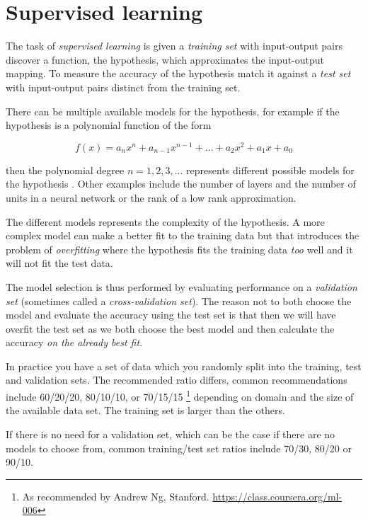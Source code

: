 
\section{Supervised learning}\label{sec:theory:suplearn}

The task of \textit{supervised learning} is given a \textit{training set} with input-output pairs discover a function, the hypothesis, which approximates the input-output mapping.  To measure the accuracy of the hypothesis match it against a \textit{test set} with input-output pairs distinct from the training set.
\citep{norvigAI}

There can be multiple available models for the hypothesis, for example if the hypothesis is a polynomial function of the form 

\begin{equation}
f(x) = a_n x^n + a_{n - 1} x^{n - 1} + ... + a_2 x^2 + a_1 x + a_0
\end{equation}

then the polynomial degree $n = 1, 2, 3, ...$ represents different possible models for the hypothesis \citep{norvigAI}. Other examples include the number of layers and the number of units in a neural network or the rank of a low rank approximation.

The different models represents the complexity of the hypothesis. A more complex model can make a better fit to the training data but that introduces the problem of \textit{overfitting} where the hypothesis fits the training data \textit{too} well and it will not fit the test data.
\citep{norvigAI}

The model selection is thus performed by evaluating performance on a \textit{validation set} (sometimes called a \textit{cross-validation set}). The reason not to both choose the model and evaluate the accuracy using the test set is that then we will have overfit the test set as we both choose the best model and then calculate the accuracy \textit{on the already best fit}.
\citep{norvigAI}

In practice you have a set of data which you randomly split into the training, test and validation sets. The recommended ratio differs, common recommendations include 60/20/20, 80/10/10, or 70/15/15 \footnote{As recommended by Andrew Ng, Stanford. \url{https://class.coursera.org/ml-006}} depending on domain and the size of the available data set. The training set is larger than the others.

If there is no need for a validation set, which can be the case if there are no models to choose from, common training/test set ratios include 70/30, 80/20 or 90/10.


